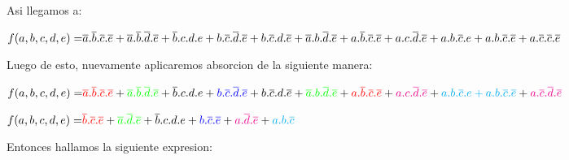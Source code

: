 \noindent
Asi llegamos a:\vspace{8mm}\par

$
\color{black}{f(a,b,c,d,e) =}  \overline{a}.\overline{b}.\overline{c}.\overline{e} \color{black}+
\vspace{5mm}\overline{a}.\overline{b}.\overline{d}.\overline{e} \color{black}+ \overline{b}.c.d.e \color{black}+ b.\overline{c}.\overline{d}.\overline{e} \color{black}+ b.\overline{c}.d.\overline{e} \color{black}+ \overline{a}.b.\overline{d}.\overline{e} \color{black}+ a.\overline{b}.\overline{c}.\overline{e} \color{black}+ a.c.\overline{d}.\overline{e} \color{black}+ a.b.\overline{c}.e \color{black}+ a.b.\overline{c}.\overline{e} \color{black}+ a.\overline{c}.\overline{c}.\overline{e}$
\vspace{8mm}\par

\noindent
Luego de esto, nuevamente aplicaremos absorcion de la siguiente manera:\vspace{8mm}\par

$
\color{black}{f(a,b,c,d,e) =}  \color{red}{\overline{a}.\overline{b}.\overline{c}.\overline{e}} \color{black}+
\vspace{5mm}\color{green}{\overline{a}.\overline{b}.\overline{d}.\overline{e}} \color{black}+ \color{black}{\overline{b}.c.d.e} \color{black}+ \color{blue}{b.\overline{c}.\overline{d}.\overline{e} \color{black}+ b.\overline{c}.d.\overline{e}} \color{black}+ \color{green}{\overline{a}.b.\overline{d}.\overline{e}} \color{black}+ \color{red}{a.\overline{b}.\overline{c}.\overline{e}} \color{black}+ \color{magenta}{a.c.\overline{d}.\overline{e}} \color{black}+ \color{cyan}{a.b.\overline{c}.e + a.b.\overline{c}.\overline{e}} \color{black}+ \color{magenta}{a.\overline{c}.\overline{d}.\overline{e}}$
\vspace{8mm}\par
$
\color{black}{f(a,b,c,d,e) =}  \color{red}{\overline{b}.\overline{c}.\overline{e}} \color{black}+ \color{green}{\overline{a}.\overline{d}.\overline{e}} \color{black}+ \color{black}{\overline{b}.c.d.e} \color{black}+ \color{blue}{b.\overline{c}.\overline{e}} \color{black}+ \color{magenta}{a.\overline{d}.\overline{e}} \color{black}+ \color{cyan}{a.b.\overline{c}}$
\vspace{8mm}\par

Entonces hallamos la siguiente expresion:\vspace{8mm}\par

